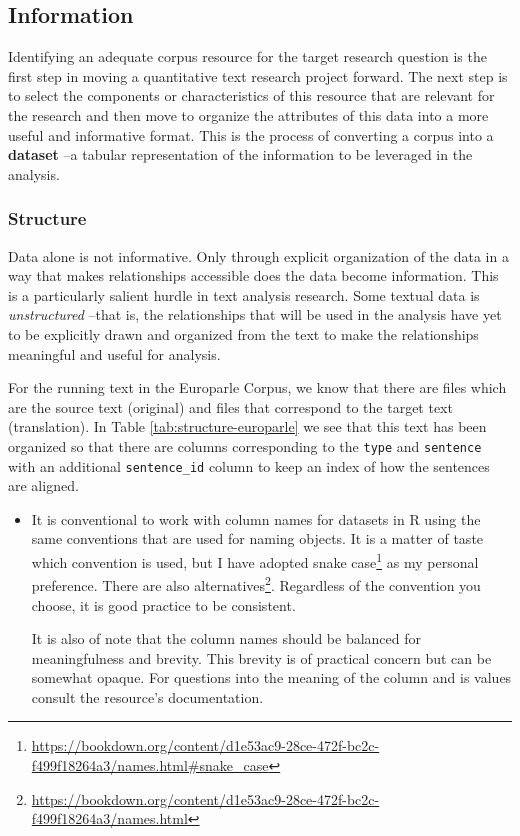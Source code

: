 \documentclass[
]{article}
\DeclareRobustCommand{\href}[2]{#2\footnote{\url{#1}}}
\newenvironment{rmdblock}[1]
  {\begin{shaded*}
  \begin{itemize}
  \renewcommand{\labelitemi}{
    \raisebox{-.5\height}[0pt][0pt]{
      {\setkeys{Gin}{width=2em,keepaspectratio}\texttt{[image: assets/images/\#1]}}
    }
  }
  \item
  }
  {
  \end{itemize}
  \end{shaded*}
  }
\newenvironment{rmdtip}
  {\begin{rmdblock}{tip}}
  {\end{rmdblock}}
\begin{document}
\hypertarget{information}{%
\subsection{Information}\label{information}}

Identifying an adequate corpus resource for the target research question is the first step in moving a quantitative text research project forward. The next step is to select the components or characteristics of this resource that are relevant for the research and then move to organize the attributes of this data into a more useful and informative format. This is the process of converting a corpus into a \textbf{dataset} --a tabular representation of the information to be leveraged in the analysis.

\hypertarget{structure}{%
\subsubsection{Structure}\label{structure}}

Data alone is not informative. Only through explicit organization of the data in a way that makes relationships accessible does the data become information. This is a particularly salient hurdle in text analysis research. Some textual data is \emph{unstructured} --that is, the relationships that will be used in the analysis have yet to be explicitly drawn and organized from the text to make the relationships meaningful and useful for analysis.

For the running text in the Europarle Corpus, we know that there are files which are the source text (original) and files that correspond to the target text (translation). In Table \ref{tab:structure-europarle} we see that this text has been organized so that there are columns corresponding to the \texttt{type} and \texttt{sentence} with an additional \texttt{sentence\_id} column to keep an index of how the sentences are aligned.

\begin{rmdtip}
It is conventional to work with column names for datasets in R using the
same conventions that are used for naming objects. It is a matter of
taste which convention is used, but I have adopted
\href{https://bookdown.org/content/d1e53ac9-28ce-472f-bc2c-f499f18264a3/names.html\#snake_case}{snake
case} as my personal preference. There are also
\href{https://bookdown.org/content/d1e53ac9-28ce-472f-bc2c-f499f18264a3/names.html}{alternatives}.
Regardless of the convention you choose, it is good practice to be
consistent.

It is also of note that the column names should be balanced for
meaningfulness and brevity. This brevity is of practical concern but can
be somewhat opaque. For questions into the meaning of the column and is
values consult the resource's documentation.
\end{rmdtip}
\end{document}
